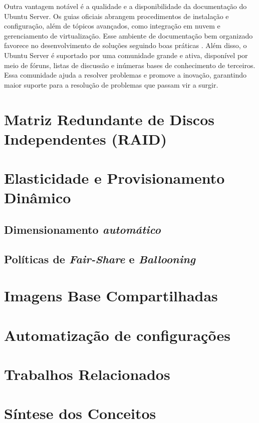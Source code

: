 Outra vantagem notável é a qualidade e a disponibilidade da documentação do Ubuntu Server. Os guias oficiais abrangem procedimentos de instalação e configuração, além de tópicos avançados, como integração em nuvem e gerenciamento de virtualização. Esse ambiente de documentação bem organizado favorece no desenvolvimento de soluções seguindo boas práticas \cite{ubuntu2025}. Além disso, o Ubuntu Server é suportado por uma comunidade grande e ativa, disponível por meio de fóruns, listas de discussão e inúmeras bases de conhecimento de terceiros. Essa comunidade ajuda a resolver problemas e promove a inovação, garantindo maior suporte para a resolução de problemas que passam vir a surgir.



\section{Matriz Redundante de Discos Independentes (RAID)}

\section{Elasticidade e Provisionamento Dinâmico}

\subsection{Dimensionamento \textit{automático}}

\subsection{Políticas de \textit{Fair-Share} e \textit{Ballooning}}

\section{Imagens Base Compartilhadas}

\section{Automatização de configurações}

\section{Trabalhos Relacionados}

\section{Síntese dos Conceitos}
